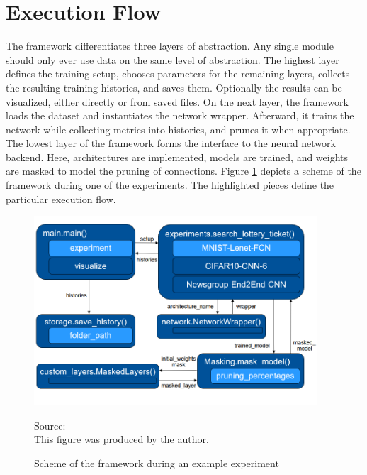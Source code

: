 
\section{Execution Flow}
The framework differentiates three layers of abstraction. Any single module should only ever use data on the same level of abstraction.
The highest layer defines the training setup, chooses parameters for the remaining layers, collects the resulting training histories, and saves them. Optionally the results can be visualized, either directly or from saved files. 
On the next layer, the framework loads the dataset and instantiates the network wrapper. Afterward, it trains the network while collecting metrics into histories, and prunes it when appropriate.
The lowest layer of the framework forms the interface to the neural network backend. Here, architectures are implemented, models are trained, and weights are masked to model the pruning of connections.
Figure \ref{fig:Example Control Flow} depicts a scheme of the framework during one of the experiments. The highlighted pieces define the particular execution flow.
\begin{figure}
	\centering
	\includegraphics[width=400px]{gfx/5-Implementation/control_flow.png}
	\caption{Scheme of the framework during an example experiment}
	\label{fig:Example Control Flow}
	\vspace{7pt}
	\footnotesize{
		Source:\\
		This figure was produced by the author.
	}
\end{figure}


